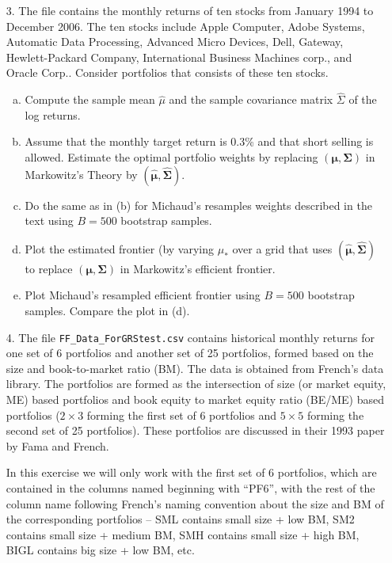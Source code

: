 \begin{enumerate}
\item[3.] The file  contains the monthly returns of ten stocks from January 1994 to December 2006. The ten stocks include Apple Computer, Adobe Systems, Automatic Data Processing, Advanced Micro Devices, Dell, Gateway, Hewlett-Packard Company, International Business Machines corp., and Oracle Corp.. Consider portfolios that consists of these ten stocks.
	\begin{enumerate}[(a)]
	\item Compute the sample mean $\hat{\mu}$ and the sample covariance matrix $\hat{\Sigma}$ of the log returns. 
	\item Assume that the monthly target return is 0.3\% and that short selling is allowed. Estimate the optimal portfolio weights by replacing $(\mathbf{\mu},\mathbf{\Sigma})$ in Markowitz's Theory by $(\hat{\mathbf{\mu}}, \hat{\mathbf{\Sigma}})$. 
	\item Do the same as in (b) for Michaud's resamples weights described in the text using $B=500$ bootstrap samples.
	\item Plot the estimated frontier (by varying $\mu_*$ over a grid that uses $(\hat{\mathbf{\mu}},\hat{\mathbf{\Sigma}})$ to replace $(\mathbf{\mu},\mathbf{\Sigma})$ in Markowitz's efficient frontier.
	\item Plot Michaud's resampled efficient frontier using $B=500$ bootstrap samples. Compare the plot in (d). 
	\end{enumerate}




\item[4.] The file {\tt FF\_Data\_ForGRStest.csv} contains historical monthly returns for one set of 6 portfolios and another set of 25 portfolios, formed based on the size and book-to-market ratio (BM). The data is obtained from French's data library. The portfolios are formed as the intersection of size (or market equity, ME) based portfolios and book equity to market equity ratio (BE/ME) based portfolios ($2\times 3$ forming the first set of 6 portfolios and $5\times 5$ forming the second set of 25 portfolios). These portfolios are discussed in their 1993 paper by Fama and French.

In this exercise we will only work with the first set of 6 portfolios, which are contained in the columns named beginning with ``PF6'', with the rest of the column name following French's naming convention about the size and BM of the corresponding portfolios -- SML contains small size + low BM, SM2 contains small size + medium BM, SMH contains small size + high BM, BIGL contains big size + low BM, etc.


\end{enumerate}
